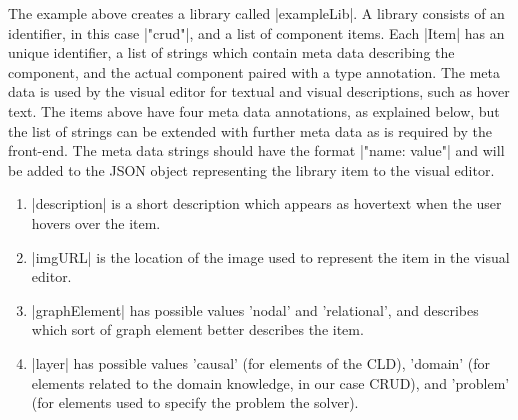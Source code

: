 \documentclass[a4paper]{article}
\begin{document}
The example above creates a library called |exampleLib|. A library consists of
an identifier, in this case |"crud"|, and a list of component items. Each
|Item|
has an unique identifier, a list of strings which contain meta data describing
the component,
and the actual component paired with a type annotation.
The meta data is used by the
visual editor for textual and visual descriptions, such as hover text.
The items above have four meta data annotations, as explained below, but the
list of strings can be extended with further meta data as is required by the
front-end. The meta data strings should have the format |"name: value"|
and will be added to the JSON object representing the library item to the visual
editor.
\begin{enumerate}
\item |description| is a short description which appears as hovertext when the
  user hovers over the item.
\item |imgURL| is the location of the image used to represent the item in the
  visual editor.
\item |graphElement| has possible values 'nodal' and 'relational', and describes
which sort of graph element better describes the item. 
\item |layer| has possible values 'causal' (for elements of the CLD),
  'domain' (for elements related to the domain knowledge, in our case CRUD),
  and 'problem' (for elements used to specify the problem the solver). 
\end{enumerate}
\end{document}
